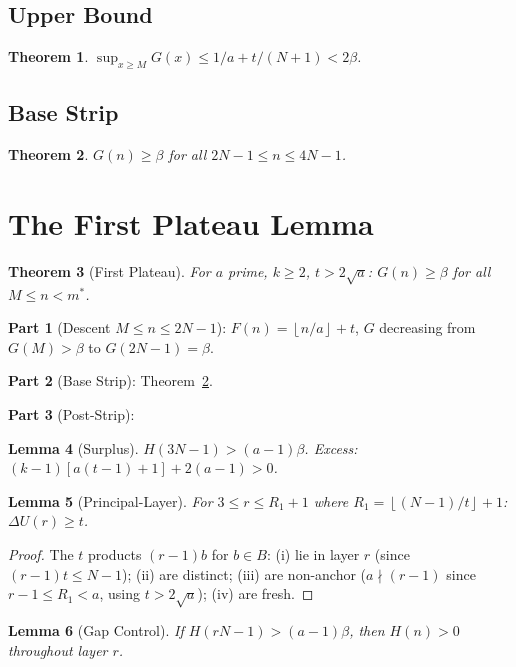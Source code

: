 \documentclass[11pt,a4paper]{article}
\newtheorem{theorem}{Theorem}[section]
\newtheorem{lemma}[theorem]{Lemma}
\theoremstyle{definition}
\newcommand{\floor}[1]{\left\lfloor #1 \right\rfloor}
\begin{document}
\subsection{Upper Bound}
\begin{theorem}\label{thm:upper} $\sup_{x \geq M} G(x) \leq 1/a + t/(N+1) < 2\beta$. \end{theorem}

\subsection{Base Strip}
\begin{theorem}\label{thm:base} $G(n) \geq \beta$ for all $2N-1 \leq n \leq 4N-1$. \end{theorem}

\section{The First Plateau Lemma}

\begin{theorem}[First Plateau]\label{thm:plateau} For $a$ prime, $k \geq 2$, $t > 2\sqrt{a}$: $G(n) \geq \beta$ for all $M \leq n < m^*$. \end{theorem}

\textbf{Part 1} (Descent $M \leq n \leq 2N-1$): $F(n) = \floor{n/a} + t$, $G$ decreasing from $G(M) > \beta$ to $G(2N-1) = \beta$.

\textbf{Part 2} (Base Strip): Theorem~\ref{thm:base}.

\textbf{Part 3} (Post-Strip):

\begin{lemma}[Surplus] $H(3N-1) > (a-1)\beta$. Excess: $(k-1)[a(t-1)+1] + 2(a-1) > 0$. \end{lemma}

\begin{lemma}[Principal-Layer]\label{lem:principal} For $3 \leq r \leq R_1+1$ where $R_1 = \floor{(N-1)/t}+1$: $\Delta U(r) \geq t$. \end{lemma}
\begin{proof} The $t$ products $(r-1)b$ for $b \in B$: (i) lie in layer $r$ (since $(r-1)t \leq N-1$); (ii) are distinct; (iii) are non-anchor ($a \nmid (r-1)$ since $r-1 \leq R_1 < a$, using $t > 2\sqrt{a}$); (iv) are fresh. \end{proof}

\begin{lemma}[Gap Control] If $H(rN-1) > (a-1)\beta$, then $H(n) > 0$ throughout layer $r$. \end{lemma}
\end{document}
